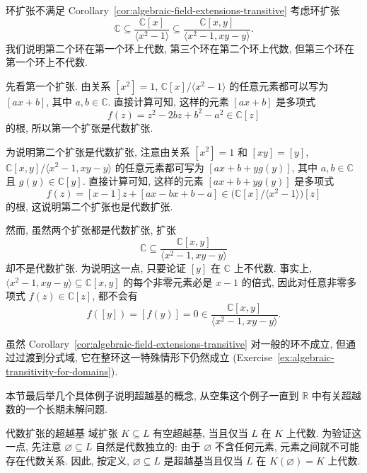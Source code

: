 \begin{Example}{环扩张不满足 Corollary~\ref{cor:algebraic-field-extensions-transitive}}\leavevmode\label{ex:algebraic-transitivity-fails-for-rings}
考虑环扩张
\[
  \mathbb{C}\subseteq\frac{\mathbb{C}[x]}{\langle x^{2}-1\rangle}
    \subseteq\frac{\mathbb{C}[x,y]}{\langle x^{2}-1,xy-y\rangle}.
\]
我们说明第二个环在第一个环上代数, 第三个环在第二个环上代数, 但第三个环在第一个环上不代数.

先看第一个扩张. 由关系 $[x^{2}]=1$, $\mathbb{C}[x]/\langle x^{2}-1\rangle$ 的任意元素都可以写为 $[ax+b]$, 其中 $a,b\in\mathbb{C}$. 直接计算可知, 这样的元素 $[ax+b]$ 是多项式
\[
  f(z)=z^{2}-2bz+b^{2}-a^{2}\in\mathbb{C}[z]
\]
的根, 所以第一个扩张是代数扩张.

为说明第二个扩张是代数扩张, 注意由关系 $[x^{2}]=1$ 和 $[xy]=[y]$, $\mathbb{C}[x,y]/\langle x^{2}-1,xy-y\rangle$ 的任意元素都可写为 $[ax+b+yg(y)]$, 其中 $a,b\in\mathbb{C}$ 且 $g(y)\in\mathbb{C}[y]$. 直接计算可知, 这样的元素 $[ax+b+yg(y)]$ 是多项式
\[
  f(z)=[x-1]z+[ax-bx+b-a]\in
  \bigl(\mathbb{C}[x]/\langle x^{2}-1\rangle\bigr)[z]
\]
的根, 这说明第二个扩张也是代数扩张.

然而, 虽然两个扩张都是代数扩张, 扩张
\[
  \mathbb{C}\subseteq\frac{\mathbb{C}[x,y]}{\langle x^{2}-1,xy-y\rangle}
\]
却不是代数扩张. 为说明这一点, 只要论证 $[y]$ 在 $\mathbb{C}$ 上不代数. 事实上, $\langle x^{2}-1,xy-y\rangle\subseteq\mathbb{C}[x,y]$ 的每个非零元素必是 $x-1$ 的倍式, 因此对任意非零多项式 $f(z)\in\mathbb{C}[z]$, 都不会有
\[
  f([y])=[f(y)]=0\in\frac{\mathbb{C}[x,y]}{\langle x^{2}-1,xy-y\rangle}.
\]
\end{Example}

虽然 Corollary~\ref{cor:algebraic-field-extensions-transitive} 对一般的环不成立, 但通过过渡到分式域, 它在整环这一特殊情形下仍然成立 (Exercise~\ref{ex:algebraic-transitivity-for-domains}).

本节最后举几个具体例子说明超越基的概念, 从空集这个例子一直到 $\mathbb{R}$ 中有关超越数的一个长期未解问题.

\begin{Example}{代数扩张的超越基}\leavevmode\label{ex:empty-transcendence-basis}
域扩张 $K\subseteq L$ 有空超越基, 当且仅当 $L$ 在 $K$ 上代数. 为验证这一点, 先注意 $\varnothing\subseteq L$ 自然是代数独立的: 由于 $\varnothing$ 不含任何元素, 元素之间就不可能存在代数关系. 因此, 按定义, $\varnothing\subseteq L$ 是超越基当且仅当 $L$ 在 $K(\varnothing)=K$ 上代数.
\end{Example}

